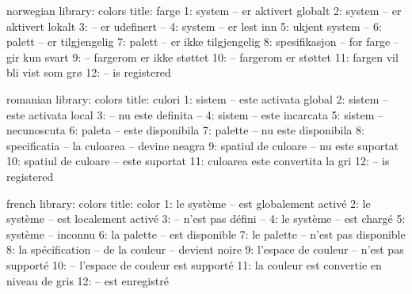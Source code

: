 \startmessages  norwegian  library: colors
  title: farge
      1: system -- er aktivert globalt
      2: system -- er aktivert lokalt
      3: -- er udefinert --
      4: system -- er lest inn
      5: ukjent system --
      6: palett -- er tilgjengelig
      7: palett -- er ikke tilgjengelig
      8: spesifikasjon -- for farge -- gir kun svart
      9: -- fargerom er ikke støttet
     10: -- fargerom er støttet
     11: fargen vil bli vist som grø
     12: -- is registered
\stopmessages

\startmessages  romanian  library: colors
  title: culori
      1: sistem -- este activata global
      2: sistem -- este activata local
      3: -- nu este definita --
      4: sistem -- este incarcata
      5: sistem -- necunoscuta
      6: paleta -- este disponibila
      7: palette -- nu este disponibila
      8: specificatia -- la culoarea -- devine neagra
      9: spatiul de culoare -- nu este suportat
     10: spatiul de culoare -- este suportat
     11: culoarea este convertita la gri
     12: -- is registered
\stopmessages

\startmessages  french  library: colors
  title: color
      1: le système -- est globalement activé
      2: le système -- est localement activé
      3: -- n'est pas défini --
      4: le système -- est chargé
      5: système -- inconnu
      6: la palette -- est disponible
      7: le palette -- n'est pas disponible
      8: la spécification -- de la couleur -- devient noire
      9: l'espace de couleur -- n'est pas supporté
     10: -- l'espace de couleur est supporté
     11: la couleur est convertie en niveau de gris
     12: -- est enregistré
\stopmessages


\newdimen{}
\newcount{}



